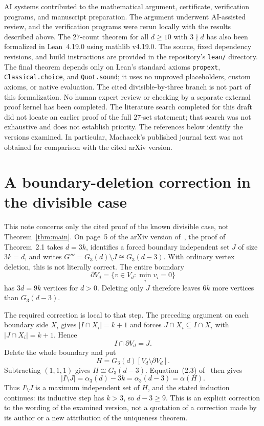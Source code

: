 \documentclass[11pt]{article}
\begin{document}
AI systems contributed to the mathematical argument, certificate,
verification programs, and manuscript preparation.
The argument underwent AI-assisted review, and the verification
programs were rerun locally with the results described above.
The \(27\)-count theorem for all \(d\geq10\) with \(3\nmid d\)
has also been formalized in Lean~4.19.0 using mathlib v4.19.0.
The source, fixed dependency revisions, and build instructions are
provided in the repository's \texttt{lean/} directory.
The final theorem depends only on Lean's standard axioms
\texttt{propext}, \texttt{Classical.choice}, and \texttt{Quot.sound};
it uses no unproved placeholders, custom axioms, or native evaluation.
The cited divisible-by-three branch is not part of this formalization.
No human expert review or checking by a separate external proof kernel
has been completed.
The literature search completed for this draft did not locate an
earlier proof of the full \(27\)-set statement; that search was not
exhaustive and does not establish priority.
The references below identify the versions examined. In particular,
Machacek's published journal text was not obtained for comparison
with the cited arXiv version.

\appendix
\section{A boundary-deletion correction in the divisible case}
\label{app:machacek}

This note concerns only the cited proof of the known divisible
case, not Theorem~\ref{thm:main}.
On page~5 of the arXiv version of~\cite{machacek}, the proof of
Theorem~2.1 takes \(d=3k\), identifies a forced boundary independent
set \(J\) of size \(3k=d\), and writes
\(G'''=G_3(d)\setminus J\cong G_3(d-3)\).
With ordinary vertex deletion, this is not literally correct.
The entire boundary
\[
 \partial V_d=\{v\in V_d:\min_i v_i=0\}
\]
has \(3d=9k\) vertices for \(d>0\). Deleting only \(J\) therefore
leaves \(6k\) more vertices than \(G_3(d-3)\).

The required correction is local to that step.
The preceding argument on each boundary side \(X_i\) gives
\(|I\cap X_i|=k+1\) and forces \(J\cap X_i\subseteq I\cap X_i\)
with \(|J\cap X_i|=k+1\). Hence
\[
 I\cap\partial V_d=J.
\]
Delete the whole boundary and put
\[
 H=G_3(d)[V_d\setminus\partial V_d].
\]
Subtracting \((1,1,1)\) gives \(H\cong G_3(d-3)\).
Equation~(2.3) of~\cite{machacek} then gives
\[
 |I\setminus J|
   =\alpha_3(d)-3k
   =\alpha_3(d-3)
   =\alpha(H).
\]
Thus \(I\setminus J\) is a maximum independent set of \(H\), and
the stated induction continues: its inductive step has \(k>3\),
so \(d-3\geq9\).
This is an explicit correction to the wording of the examined
version, not a quotation of a correction made by its author or
a new attribution of the uniqueness theorem.
\end{document}
